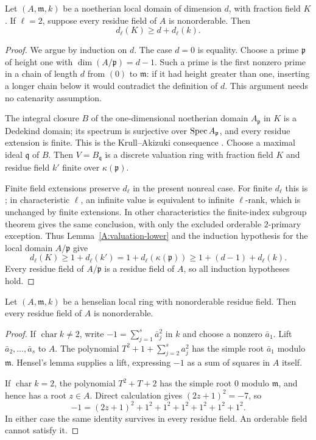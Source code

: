 \begin{lemma}
\label{A:allresidues-lower}
Let $(A,\mathfrak m,k)$ be a noetherian local domain of dimension $d$, with fraction field $K$. If $\ell=2$, suppose every residue field of $A$ is nonorderable. Then
\[
d_\ell(K)\geq d+d_\ell(k).
\]
\end{lemma}
\begin{proof}
We argue by induction on $d$. The case $d=0$ is equality. Choose a prime $\mathfrak p$ of height one with $\dim(A/\mathfrak p)=d-1$. Such a prime is the first nonzero prime in a chain of length $d$ from $(0)$ to $\mathfrak m$: if it had height greater than one, inserting a longer chain below it would contradict the definition of $d$. This argument needs no catenarity assumption.

The integral closure $B$ of the one-dimensional noetherian domain $A_{\mathfrak p}$ in $K$ is a Dedekind domain; its spectrum is surjective over $\operatorname{Spec} A_{\mathfrak p}$, and every residue extension is finite. This is the Krull--Akizuki consequence \citet[Tag 09IG, Lemma 10.120.18]{A_Stacks}. Choose a maximal ideal $\mathfrak q$ of $B$. Then $V=B_{\mathfrak q}$ is a discrete valuation ring with fraction field $K$ and residue field $k'$ finite over $\kappa(\mathfrak p)$.

Finite field extensions preserve $d_\ell$ in the present nonreal case. For finite $d_\ell$ this is \citet[\S2.2, final lemma on finite extensions]{A_GO2008}; in characteristic $\ell$, an infinite value is equivalent to infinite $\ell$-rank, which is unchanged by finite extensions. In other characteristics the finite-index subgroup theorem gives the same conclusion, with only the excluded orderable $2$-primary exception. Thus Lemma~\ref{A:valuation-lower} and the induction hypothesis for the local domain $A/\mathfrak p$ give
\[
d_\ell(K)\geq1+d_\ell(k')
=1+d_\ell(\kappa(\mathfrak p))
\geq1+(d-1)+d_\ell(k).
\]
Every residue field of $A/\mathfrak p$ is a residue field of $A$, so all induction hypotheses hold.
\end{proof}

\begin{lemma}
\label{A:hens-nonreal}
Let $(A,\mathfrak m,k)$ be a henselian local ring with nonorderable residue field. Then every residue field of $A$ is nonorderable.
\end{lemma}
\begin{proof}
If $\operatorname{char}k\neq2$, write $-1=\sum_{j=1}^s\bar a_j^2$ in $k$ and choose a nonzero $\bar a_1$. Lift $\bar a_2,\ldots,\bar a_s$ to $A$. The polynomial $T^2+1+\sum_{j=2}^s a_j^2$ has the simple root $\bar a_1$ modulo $\mathfrak m$. Hensel's lemma supplies a lift, expressing $-1$ as a sum of squares in $A$ itself.

If $\operatorname{char}k=2$, the polynomial $T^2+T+2$ has the simple root $0$ modulo $\mathfrak m$, and hence has a root $z\in A$. Direct calculation gives $(2z+1)^2=-7$, so
\[
-1=(2z+1)^2+1^2+1^2+1^2+1^2+1^2+1^2.
\]
In either case the same identity survives in every residue field. An orderable field cannot satisfy it.
\end{proof}

